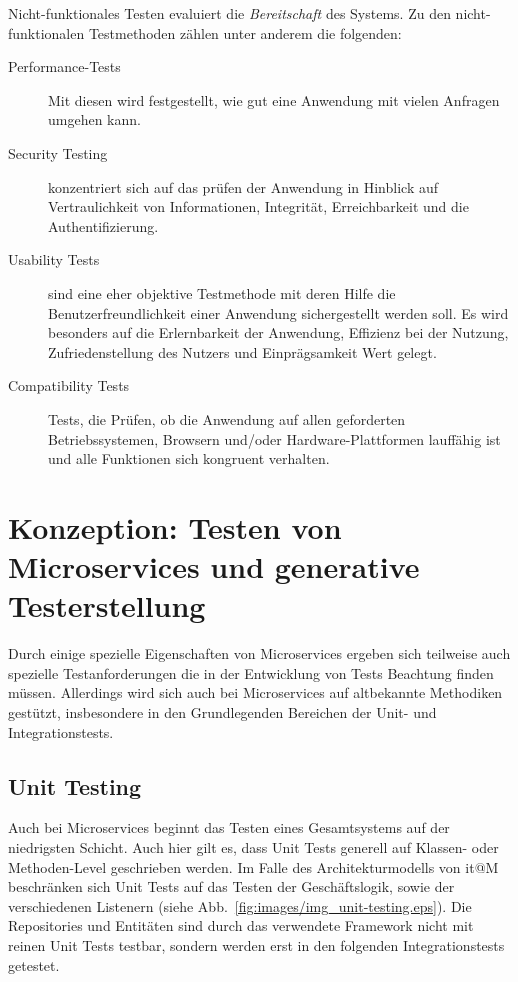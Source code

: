 \documentclass[12pt,a4paper,bibliography=totocnumbered,listof=totocnumbered]{scrartcl}
\begin{document}

Nicht-funktionales Testen evaluiert die \textit{Bereitschaft} des Systems.\cite{erikssontesting} Zu den nicht-funktionalen Testmethoden zählen unter anderem die folgenden\cite{inflectra}:

\begin{description}
	\item[Performance-Tests] Mit diesen wird festgestellt, wie gut eine Anwendung mit vielen Anfragen umgehen kann.
	\item[Security Testing] konzentriert sich auf das prüfen der Anwendung in Hinblick auf Vertraulichkeit von Informationen, Integrität, Erreichbarkeit und die Authentifizierung.
	\item[Usability Tests] sind eine eher objektive Testmethode mit deren Hilfe die Benutzerfreundlichkeit einer Anwendung sichergestellt werden soll. Es wird besonders auf die Erlernbarkeit der Anwendung, Effizienz bei der Nutzung, Zufriedenstellung des Nutzers und Einprägsamkeit Wert gelegt.
	\item[Compatibility Tests] Tests, die Prüfen, ob die Anwendung auf allen geforderten Betriebssystemen, Browsern und/oder Hardware-Plattformen lauffähig ist und alle Funktionen sich kongruent verhalten.
\end{description} 

\section{Konzeption: Testen von Microservices und generative Testerstellung}\label{ch:ms-test}
\label{sec:testingms}

Durch einige spezielle Eigenschaften von Microservices ergeben sich teilweise auch spezielle Testanforderungen die in der Entwicklung von Tests Beachtung finden müssen. Allerdings wird sich auch bei Microservices auf altbekannte Methodiken gestützt, insbesondere in den Grundlegenden Bereichen der Unit- und Integrationstests.

\subsection{Unit Testing}

Auch bei Microservices beginnt das Testen eines Gesamtsystems auf der niedrigsten Schicht. Auch hier gilt es, dass Unit Tests generell auf Klassen- oder Methoden-Level geschrieben werden.\cite{clemson} Im Falle des Architekturmodells von it@M beschränken sich Unit Tests auf das Testen der Geschäftslogik, sowie der verschiedenen Listenern (siehe Abb.~\ref{fig:images/img_unit-testing.eps}). Die Repositories und Entitäten sind durch das verwendete Framework nicht mit reinen Unit Tests testbar, sondern werden erst in den folgenden Integrationstests getestet.
\end{document}
